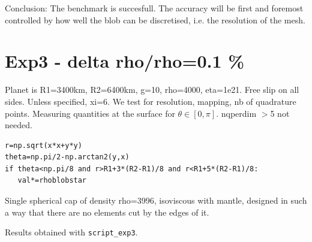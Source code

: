 Conclusion: The benchmark is succesfull. 
The accuracy will be first and foremost controlled by how well the blob can be discretised, 
i.e. the resolution of the mesh. 





\newpage
\section{Exp3 - delta rho/rho=0.1 \%}

Planet is R1=3400km, R2=6400km, g=10, rho=4000, eta=1e21.
Free slip on all sides. Unless specified, xi=6.
We test for resolution, mapping, nb of quadrature points.
Measuring quantities at the surface for $\theta\in[0,\pi]$.
nqperdim $>$5  not needed. 

\begin{lstlisting}
r=np.sqrt(x*x+y*y)
theta=np.pi/2-np.arctan2(y,x)
if theta<np.pi/8 and r>R1+3*(R2-R1)/8 and r<R1+5*(R2-R1)/8:
   val*=rhoblobstar
\end{lstlisting}

Single spherical cap of density rho=3996, isoviscous with mantle,
designed in such a way that there are no elements cut by the edges of it.

Results obtained with {\tt script\_exp3}.

